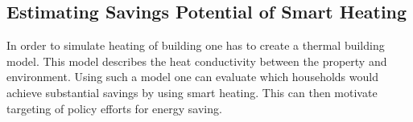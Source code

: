 \subsection{Estimating Savings Potential of Smart Heating}
In order to simulate heating of building one has to create a thermal building model.
This model describes the heat conductivity between the property and environment.
Using such a model one can evaluate which households would achieve substantial savings by using smart heating.
This can then motivate targeting of policy efforts for energy saving.



